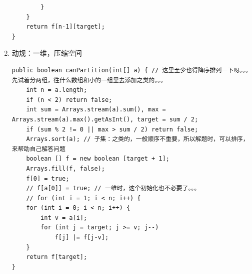 \documentclass[9pt, b5paaper]{book}
\begin{document}
\begin{enumerate}
\begin{verbatim}
        }
    }
    return f[n-1][target];
}
\end{verbatim}
\item 动规：一维，压缩空间
\label{sec-1-7-2-2}
\begin{verbatim}
public boolean canPartition(int[] a) { // 这里至少也得降序排列一下呀。。。先试着分两组，往什么数组和小的一组里去添加之类的。。。
    int n = a.length;
    if (n < 2) return false;
    int sum = Arrays.stream(a).sum(), max = Arrays.stream(a).max().getAsInt(), target = sum / 2;
    if (sum % 2 != 0 || max > sum / 2) return false;
    Arrays.sort(a); // 子集：之类的，一般顺序不重要，所以解题时，可以排序，来帮助自己解答问题
    boolean [] f = new boolean [target + 1];
    Arrays.fill(f, false);
    f[0] = true;
    // f[a[0]] = true; // 一维时，这个初始化也不必要了。。。
    // for (int i = 1; i < n; i++) {
    for (int i = 0; i < n; i++) {
        int v = a[i];
        for (int j = target; j >= v; j--)
            f[j] |= f[j-v];
    }
    return f[target];
}
\end{verbatim}
\end{enumerate}
\end{document}
